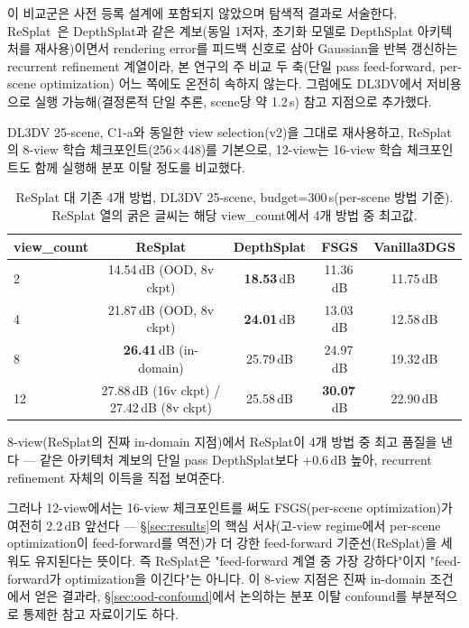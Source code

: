 이 비교군은 사전 등록 설계에 포함되지 않았으며 탐색적 결과로 서술한다. ReSplat~\cite{xu2026resplat}은 DepthSplat과 같은 계보(동일 1저자, 초기화 모델로 DepthSplat 아키텍처를 재사용)이면서 rendering error를 피드백 신호로 삼아 Gaussian을 반복 갱신하는 recurrent refinement 계열이라, 본 연구의 주 비교 두 축(단일 pass feed-forward, per-scene optimization) 어느 쪽에도 온전히 속하지 않는다. 그럼에도 DL3DV에서 저비용으로 실행 가능해(결정론적 단일 추론, scene당 약 1.2\,s) 참고 지점으로 추가했다.

DL3DV 25-scene, C1-a와 동일한 view selection(v2)을 그대로 재사용하고, ReSplat의 8-view 학습 체크포인트(256$\times$448)를 기본으로, 12-view는 16-view 학습 체크포인트도 함께 실행해 분포 이탈 정도를 비교했다.

\begin{table}[t]
\centering
\caption{ReSplat 대 기존 4개 방법, DL3DV 25-scene, budget=300\,s(per-scene 방법 기준). ReSplat 열의 굵은 글씨는 해당 view\_count에서 4개 방법 중 최고값.}
\label{tab:resplat-exploratory}
\begin{tabular}{lcccc}
\toprule
view\_count & ReSplat & DepthSplat & FSGS & Vanilla3DGS \\
\midrule
2  & 14.54\,dB (OOD, 8v ckpt) & \textbf{18.53}\,dB & 11.36\,dB & 11.75\,dB \\
4  & 21.87\,dB (OOD, 8v ckpt) & \textbf{24.01}\,dB & 13.03\,dB & 12.58\,dB \\
8  & \textbf{26.41}\,dB (in-domain) & 25.79\,dB & 24.97\,dB & 19.32\,dB \\
12 & 27.88\,dB (16v ckpt) / 27.42\,dB (8v ckpt) & 25.58\,dB & \textbf{30.07}\,dB & 22.90\,dB \\
\bottomrule
\end{tabular}
\end{table}

8-view(ReSplat의 진짜 in-domain 지점)에서 ReSplat이 4개 방법 중 최고 품질을 낸다 — 같은 아키텍처 계보의 단일 pass DepthSplat보다 +0.6\,dB 높아, recurrent refinement 자체의 이득을 직접 보여준다.

그러나 12-view에서는 16-view 체크포인트를 써도 FSGS(per-scene optimization)가 여전히 2.2\,dB 앞선다 — \S\ref{sec:results}의 핵심 서사(고-view regime에서 per-scene optimization이 feed-forward를 역전)가 더 강한 feed-forward 기준선(ReSplat)을 세워도 유지된다는 뜻이다. 즉 ReSplat은 "feed-forward 계열 중 가장 강하다"이지 "feed-forward가 optimization을 이긴다"는 아니다. 이 8-view 지점은 진짜 in-domain 조건에서 얻은 결과라, \S\ref{sec:ood-confound}에서 논의하는 분포 이탈 confound를 부분적으로 통제한 참고 자료이기도 하다.

